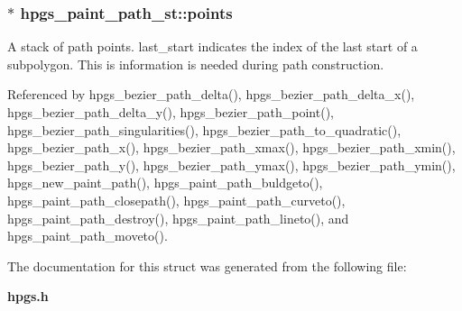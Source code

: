 \subsubsection[{points}]{$\ast$ {\bf hpgs\_\-paint\_\-path\_\-st::points}}\label{structhpgs__paint__path__st_a8731bebc1e5715a5e4838035349afc3e}
A stack of path points. {\ttfamily last\_\-start} indicates the index of the last start of a subpolygon. This is information is needed during path construction. 

Referenced by hpgs\_\-bezier\_\-path\_\-delta(), hpgs\_\-bezier\_\-path\_\-delta\_\-x(), hpgs\_\-bezier\_\-path\_\-delta\_\-y(), hpgs\_\-bezier\_\-path\_\-point(), hpgs\_\-bezier\_\-path\_\-singularities(), hpgs\_\-bezier\_\-path\_\-to\_\-quadratic(), hpgs\_\-bezier\_\-path\_\-x(), hpgs\_\-bezier\_\-path\_\-xmax(), hpgs\_\-bezier\_\-path\_\-xmin(), hpgs\_\-bezier\_\-path\_\-y(), hpgs\_\-bezier\_\-path\_\-ymax(), hpgs\_\-bezier\_\-path\_\-ymin(), hpgs\_\-new\_\-paint\_\-path(), hpgs\_\-paint\_\-path\_\-buldgeto(), hpgs\_\-paint\_\-path\_\-closepath(), hpgs\_\-paint\_\-path\_\-curveto(), hpgs\_\-paint\_\-path\_\-destroy(), hpgs\_\-paint\_\-path\_\-lineto(), and hpgs\_\-paint\_\-path\_\-moveto().



The documentation for this struct was generated from the following file:\begin{DoxyCompactItemize}
\item 
{\bf hpgs.h}\end{DoxyCompactItemize}
